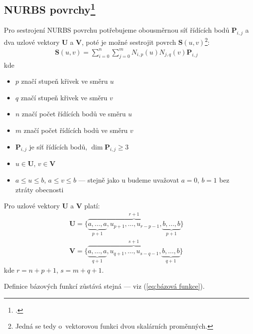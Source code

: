 \subsection[NURBS povrchy]{NURBS povrchy\footcite[kapitola 3.4]{The_NURBS_Book}}
Pro sestrojení NURBS povrchu potřebujeme obousměrnou síť řídících bodů $\bm{P}_{i,j}$ a
dva uzlové vektory $\bm{U}$ a $\bm{V}$, poté je možné sestrojit povrch $\bm{S}(u,v)$\footnote{Jedná se tedy o~vektorovou funkci dvou skalárních proměnných.}:
\begin{align}
    \bm{S}(u,v) = \sum_{i=0}^{n}\sum_{j=0}^{m}N_{i,p}(u)N_{j,q}(v)\bm{P}_{i,j}
\end{align}
kde
\begin{itemize}
    \item $p$ značí stupeň křivek ve směru $u$
    \item $q$ značí stupeň křivek ve směru $v$
    \item $n$ značí počet řídících bodů ve směru $u$
    \item $m$ značí počet řídících bodů ve směru $v$
    \item $\bm{P}_{i,j}$ je síť řídících bodů, $\dim{\bm{P}_{i,j}} \ge 3$
    \item $u \in \bm{U}$, $v \in \bm{V}$
    \item $a \le u \le b$, $a \le v \le b$ --- stejně jako u  budeme uvažovat $a = 0$, $b = 1$ bez ztráty obecnosti
\end{itemize}
Pro uzlové vektory $\bm{U}$ a $\bm{V}$ platí:
\begin{align}
    \bm{U} = \{\overbrace{\underbrace{a, \ldots, a}_{p + 1}, u_{p + 1}, \ldots, u_{r -p - 1}, \underbrace{b, \ldots, b}_{p + 1}}^{r + 1}\}\\
    \bm{V} = \{\overbrace{\underbrace{a, \ldots, a}_{q + 1}, u_{q + 1}, \ldots, u_{s -q - 1}, \underbrace{b, \ldots, b}_{q + 1}}^{s + 1}\}
\end{align}
kde $r = n + p + 1$, $s = m + q + 1$. \par Definice bázových funkcí zůstává stejná --- viz (\ref{eq:bázová funkce}).